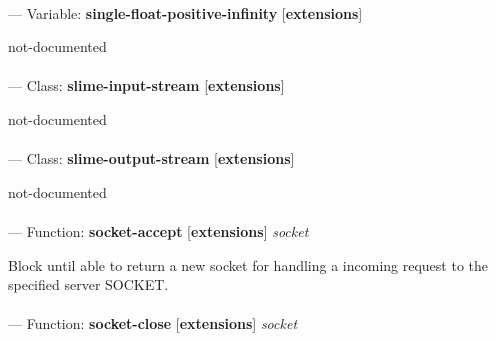 \paragraph{}
\label{EXTENSIONS:SINGLE-FLOAT-POSITIVE-INFINITY}
--- Variable: \textbf{single-float-positive-infinity} [\textbf{extensions}] \textit{}

\begin{adjustwidth}{5em}{5em}
not-documented
\end{adjustwidth}

\paragraph{}
\label{EXTENSIONS:SLIME-INPUT-STREAM}
--- Class: \textbf{slime-input-stream} [\textbf{extensions}] \textit{}

\begin{adjustwidth}{5em}{5em}
not-documented
\end{adjustwidth}

\paragraph{}
\label{EXTENSIONS:SLIME-OUTPUT-STREAM}
--- Class: \textbf{slime-output-stream} [\textbf{extensions}] \textit{}

\begin{adjustwidth}{5em}{5em}
not-documented
\end{adjustwidth}

\paragraph{}
\label{EXTENSIONS:SOCKET-ACCEPT}
--- Function: \textbf{socket-accept} [\textbf{extensions}] \textit{socket}

\begin{adjustwidth}{5em}{5em}
Block until able to return a new socket for handling a incoming request to the specified server SOCKET.
\end{adjustwidth}

\paragraph{}
\label{EXTENSIONS:SOCKET-CLOSE}
--- Function: \textbf{socket-close} [\textbf{extensions}] \textit{socket}

